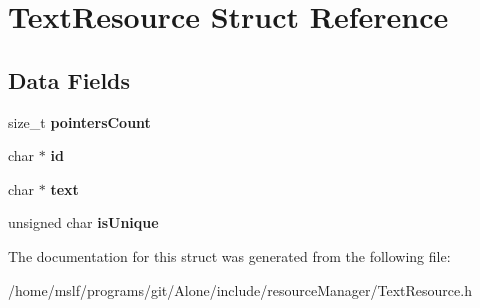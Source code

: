 \hypertarget{struct_text_resource}{}\section{Text\+Resource Struct Reference}
\label{struct_text_resource}
\subsection*{Data Fields}
\begin{DoxyCompactItemize}
\item 
\hypertarget{struct_text_resource_aa058e87a17f5f5079be31c1631ed5f50}{}\label{struct_text_resource_aa058e87a17f5f5079be31c1631ed5f50} 
size\+\_\+t {\bfseries pointers\+Count}
\item 
\hypertarget{struct_text_resource_aecb3b0d045ada529257a2fbf8f829599}{}\label{struct_text_resource_aecb3b0d045ada529257a2fbf8f829599} 
char $\ast$ {\bfseries id}
\item 
\hypertarget{struct_text_resource_a5633b1433389cec21ade3811bbe9ca5b}{}\label{struct_text_resource_a5633b1433389cec21ade3811bbe9ca5b} 
char $\ast$ {\bfseries text}
\item 
\hypertarget{struct_text_resource_a0473d732b3400461ba1f14e08fc16cd2}{}\label{struct_text_resource_a0473d732b3400461ba1f14e08fc16cd2} 
unsigned char {\bfseries is\+Unique}
\end{DoxyCompactItemize}


The documentation for this struct was generated from the following file\+:\begin{DoxyCompactItemize}
\item 
/home/mslf/programs/git/\+Alone/include/resource\+Manager/Text\+Resource.\+h\end{DoxyCompactItemize}
